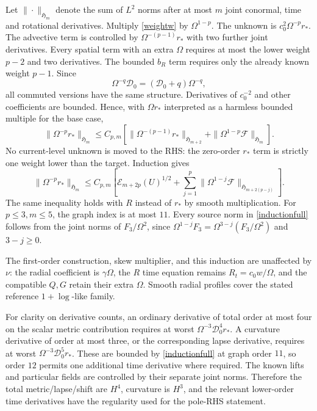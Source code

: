 \documentclass[11pt]{article}
\begin{document}
Let $\|\cdot\|_{\mathfrak H_m}$ denote the sum of $L^2$ norms after at most $m$ joint conormal, time and rotational derivatives. Multiply \eqref{weightw} by $\Omega^{1-p}$. The unknown is $c_0^2\Omega^{-p}r_*$. The advective term is controlled by $\Omega^{-(p-1)}r_*$ with two further joint derivatives. Every spatial term with an extra $\Omega$ requires at most the lower weight $p-2$ and two derivatives. The bounded $b_R$ term requires only the already known weight $p-1$. Since
\[
 \Omega^{-q}\mathcal D_0=(\mathcal D_0+q)\Omega^{-q},
\]
all commuted versions have the same structure. Derivatives of $c_0^{-2}$ and other coefficients are bounded. Hence, with $\Omega r_*$ interpreted as a harmless bounded multiple for the base case,
\begin{equation}
 \|\Omega^{-p}r_*\|_{\mathfrak H_m}
 \le C_{p,m}\left[
 \|\Omega^{-(p-1)}r_*\|_{\mathfrak H_{m+2}}
 +\|\Omega^{1-p}\mathcal F\|_{\mathfrak H_m}\right].\label{induction}
\end{equation}
No current-level unknown is moved to the RHS: the zero-order $r_*$ term is strictly one weight lower than the target. Induction gives
\begin{equation}
 \|\Omega^{-p}r_*\|_{\mathfrak H_m}
 \le C_{p,m}\left[
 \mathcal E_{m+2p}(U)^{1/2}
 +\sum_{j=1}^p
 \|\Omega^{1-j}\mathcal F\|_{\mathfrak H_{m+2(p-j)}}
 \right].\label{inductionfull}
\end{equation}
The same inequality holds with $R$ instead of $r_*$ by smooth multiplication. For $p\le3,m\le5$, the graph index is at most $11$. Every source norm in \eqref{inductionfull} follows from the joint norms of $F_3/\Omega^2$, since $\Omega^{1-j}F_3=\Omega^{3-j}(F_3/\Omega^2)$ and $3-j\ge0$.

The first-order construction, skew multiplier, and this induction are unaffected by $\nu$: the radial coefficient is $\gamma\Omega$, the $R$ time equation remains $R_t=c_0w/\Omega$, and the compatible $Q,G$ retain their extra $\Omega$. Smooth radial profiles cover the stated reference $1+\log$-like family.

For clarity on derivative counts, an ordinary derivative of total order at most four on the scalar metric contribution requires at worst $\Omega^{-3}\mathcal D_0^4r_*$. A curvature derivative of order at most three, or the corresponding lapse derivative, requires at worst $\Omega^{-3}\mathcal D_0^5r_*$. These are bounded by \eqref{inductionfull} at graph order $11$, so order $12$ permits one additional time derivative where required. The known lifts and particular fields are controlled by their separate joint norms. Therefore the total metric/lapse/shift are $H^4$, curvature is $H^3$, and the relevant lower-order time derivatives have the regularity used for the pole-RHS statement.
\end{document}
